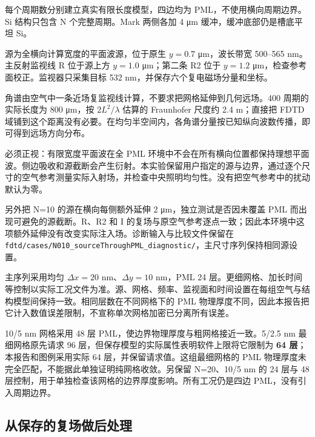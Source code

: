 \documentclass[
  chinese,
  UTF8,
  a4paper,
  11pt]{ctexart}
\begin{document}
每个周期数分别建立真实有限长度模型，四边均为 PML，不使用横向周期边界。Si
结构只包含 N 个完整周期。Mark 两侧各加 4 μm 缓冲，缓冲底部仍是槽底平坦
Si。

源为全横向计算宽度的平面波源，位于原生 \(y=0.7\) μm，波长带宽 500--565
nm。主反射监视线 R 位于源上方 \(y=1.0\) μm；第二条 R2 位于 \(y=1.2\)
μm，检查参考面校正。监视器只采集目标 532
nm，并保存六个复电磁场分量和坐标。

角谱由空气中一条近场复监视线计算，不要求把网格延伸到几何远场。400
周期的实际长度为 800 μm，按 \(2L^2/\lambda\) 估算的 Fraunhofer 尺度约
2.4 m；直接把 FDTD
域铺到这个距离没有必要。在均匀半空间内，各角谱分量按已知纵向波数传播，即可得到远场方向分布。

必须正视：有限宽度平面波在全 PML
环境中不会在所有横向位置都保持理想平面波。侧边吸收和源截断会产生衍射。本实验保留用户指定的源与边界，通过逐个尺寸的空气参考测量实际入射场，并检查中央照明均匀性。没有把空气参考中的扰动默认为零。

另外把 N=10 的源在横向每侧额外延伸 2 μm，独立测试是否因未覆盖 PML
而出现可避免的源截断。R、R2 和 I
的复场与原空气参考逐点一致；因此本环境中这项额外延伸没有改变实际注入场。诊断输入与比较文件保留在
\texttt{fdtd/cases/N010\_sourceThroughPML\_diagnostic/}，主尺寸序列保持相同源设置。

主序列采用均匀 \(\Delta x=20\) nm、\(\Delta y=10\) nm，PML 24
层。更细网格、加长时间等控制以实际工况文件为准。源、网格、频率、监视面和时间设置在每组空气与结构模型间保持一致。相同层数在不同网格下的
PML
物理厚度不同，因此本报告把它计入数值误差限制，不宣称单次网格加密已分离所有误差。

10/5 nm 网格采用 48 层 PML，使边界物理厚度与粗网格接近一致。5/2.5 nm
最细网格原先请求 96 层，但保存模型的实际属性表明软件上限将它限制为
\textbf{64 层}；本报告和图例采用实际 64 层，并保留请求值。这组最细网格的
PML 物理厚度未完全匹配，不能据此单独证明纯网格收敛。另保留 N=20、10/5 nm
的 24 层与 48 层控制，用于单独检查该网格的边界厚度影响。所有工况仍是四边
PML，没有引入周期边界。

\subsection{从保存的复场做后处理}\label{ux4eceux4fddux5b58ux7684ux590dux573aux505aux540eux5904ux7406}
\end{document}
